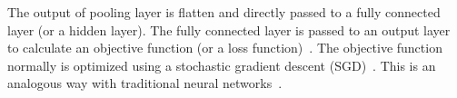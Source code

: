 The output of pooling layer is flatten and directly passed to a fully connected layer (or a hidden layer). The fully connected layer is passed to an output layer to calculate an objective function (or a loss function)~\cite{zhao2017loss}. The objective function normally is optimized using a stochastic gradient descent (SGD)~\cite{bottou2010large}. This is an analogous way with traditional neural networks~\cite{huang1988neural}.



